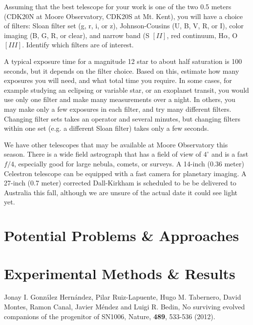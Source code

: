 \documentclass[dvips,12pt]{article}
\begin{document}
Assuming that the best telescope for your work is one of the two 0.5 meters
(CDK20N at Moore Observatory, CDK20S at Mt. Kent), you will have a choice of
filters:  Sloan filter set (g, r, i, or z),  Johnson-Cousins (U, B, V, R, or I),
color imaging (B, G, R, or clear), and narrow band (S $[II]$, red continuum,
H$\alpha$,  O$[III]$.  Identify which filters are of interest.

A typical exposure time for a magnitude 12 star to about half saturation is 100
seconds, but it depends on the filter choice.  Based on this, estimate how many
exposures you will need, and what total time you require.  In some cases, for
example studying an eclipsing or variable star, or an exoplanet transit, you
would use only one filter and make many measurements over a night.  In others,
you may make only a few exposures in each filter, and try many different
filters.   Changing filter sets takes an operator and several minutes, but
changing filters within one set (e.g. a different Sloan filter) takes only a few
seconds.

We have other telescopes that may be available at Moore Observatory this season.
There is a wide field astrograph that has a field of view of $4^\circ$ and is a
fast $f/4$,  especially good for large nebula, comets, or surveys.  A 14-inch
(0.36 meter) Celestron  telescope can be equipped with a fast camera for
planetary imaging.  A 27-inch (0.7 meter)  corrected Dall-Kirkham is scheduled
to be be delivered to Australia this fall, although we are unsure of the actual
date it could see light yet.  

\section{Potential Problems \& Approaches}
 
\section{Experimental Methods \& Results}

\begin{thebibliography}{99}

 Jonay I. Gonz\'{a}lez Hern\'{a}ndez, 
Pilar Ruiz-Lapuente,	
Hugo M. Tabernero,	
David Montes,	
Ramon Canal,	
Javier M\'{e}ndez	
and Luigi R. Bedin,
{No surviving evolved companions of the progenitor of SN1006},
Nature, {\bf 489}, 533-536 (2012).

\end{thebibliography}
\end{document}
